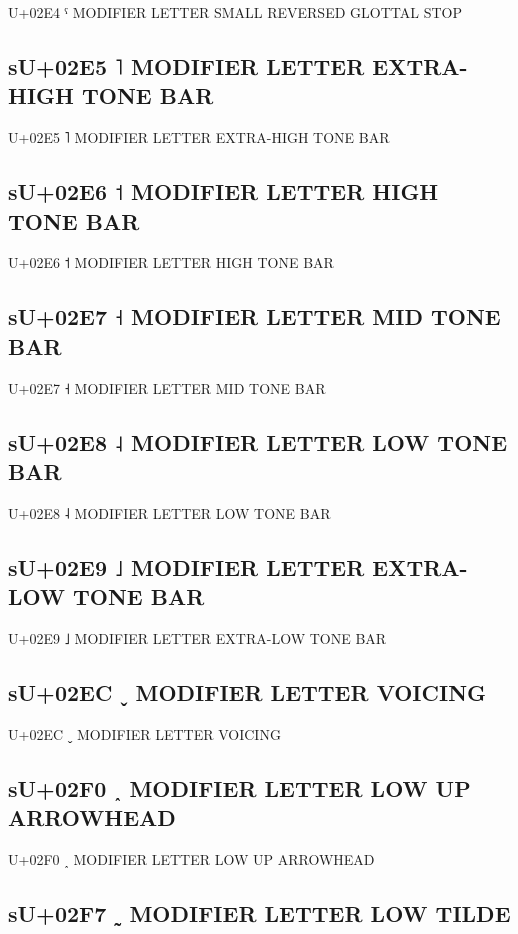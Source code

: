 U+02E4 ˤ MODIFIER LETTER SMALL REVERSED GLOTTAL STOP

\subsection{sU+02E5 ˥ MODIFIER LETTER EXTRA-HIGH TONE BAR}

U+02E5 ˥ MODIFIER LETTER EXTRA-HIGH TONE BAR

\subsection{sU+02E6 ˦ MODIFIER LETTER HIGH TONE BAR}

U+02E6 ˦ MODIFIER LETTER HIGH TONE BAR

\subsection{sU+02E7 ˧ MODIFIER LETTER MID TONE BAR}

U+02E7 ˧ MODIFIER LETTER MID TONE BAR

\subsection{sU+02E8 ˨ MODIFIER LETTER LOW TONE BAR}

U+02E8 ˨ MODIFIER LETTER LOW TONE BAR

\subsection{sU+02E9 ˩ MODIFIER LETTER EXTRA-LOW TONE BAR}

U+02E9 ˩ MODIFIER LETTER EXTRA-LOW TONE BAR

\subsection{sU+02EC ˬ MODIFIER LETTER VOICING}

U+02EC ˬ MODIFIER LETTER VOICING

\subsection{sU+02F0 ˰ MODIFIER LETTER LOW UP ARROWHEAD}

U+02F0 ˰ MODIFIER LETTER LOW UP ARROWHEAD

\subsection{sU+02F7 ˷ MODIFIER LETTER LOW TILDE}

